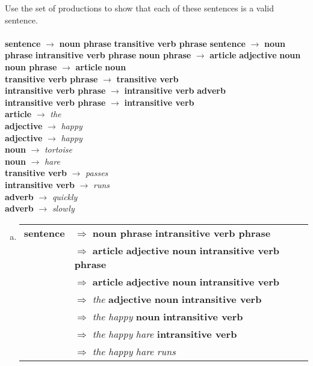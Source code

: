 \documentclass[../main.tex]{subfiles}
\begin{document}
Use the set of productions to show that each of these sentences is a valid sentence. \\
\\
{\bf sentence} $\rightarrow$ {\bf noun phrase} {\bf transitive verb phrase}
{\bf sentence} $\rightarrow$ {\bf noun phrase} {\bf intransitive verb phrase}
{\bf noun phrase} $\rightarrow$ {\bf article} {\bf adjective} {\bf noun} \\
{\bf noun phrase} $\rightarrow$ {\bf article} {\bf noun} \\
{\bf transitive verb phrase} $\rightarrow$ {\bf transitive verb} \\
{\bf intransitive verb phrase} $\rightarrow$ {\bf intransitive verb} {\bf adverb} \\
{\bf intransitive verb phrase} $\rightarrow$ {\bf intransitive verb} \\
{\bf article} $\rightarrow$ {\it the} \\
{\bf adjective} $\rightarrow$ {\it happy} \\
{\bf adjective} $\rightarrow$ {\it happy} \\
{\bf noun} $\rightarrow$ {\it tortoise} \\
{\bf noun} $\rightarrow$ {\it hare} \\
{\bf transitive verb} $\rightarrow$ {\it passes} \\
{\bf intransitive verb} $\rightarrow$ {\it runs} \\
{\bf adverb} $\rightarrow$ {\it quickly} \\
{\bf adverb} $\rightarrow$ {\it slowly}

\solution
\begin{enumerate}[a)]
	\item \hfill
		\begin{tabular}{ll}
			{\bf sentence} & $\Rightarrow$ {\bf noun phrase} {\bf intransitive verb phrase} \\
			               & $\Rightarrow$ {\bf article} {\bf adjective} {\bf noun} {\bf intransitive verb phrase} \\
						   & $\Rightarrow$ {\bf article} {\bf adjective} {\bf noun} {\bf intransitive verb}\\
						   & $\Rightarrow$ {\it the} {\bf adjective} {\bf noun} {\bf intransitive verb} \\
						   & $\Rightarrow$ {\it the} {\it happy} {\bf noun} {\bf intransitive verb} \\
						   & $\Rightarrow$ {\it the} {\it happy} {\it hare} {\bf intransitive verb} \\
						   & $\Rightarrow$ {\it the} {\it happy} {\it hare} {\it runs}\\
		\end{tabular}
\end{enumerate}
\end{document}
